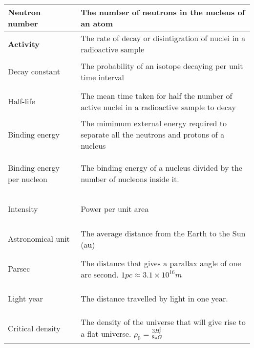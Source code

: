 \documentclass{article}
\begin{document}
\begin{longtable}{>{\bf\centering\arraybackslash}p{1in} 
  p{\textwidth-4\tabcolsep-1in}}
  Neutron number & The number of neutrons in the nucleus of an atom\\ \midrule

  Activity & The rate of decay or disintigration of nuclei in a radioactive
  sample\\ \midrule

  Decay constant & The probability of an isotope decaying per unit time
  interval\\ \midrule

  Half-life & The mean time taken for half the number of active nuclei in a
  radioactive sample to decay\\ \midrule

  Binding energy & The mimimum external energy required to separate all the
  neutrons and protons of a nucleus\\ \midrule

  Binding energy per nucleon & The binding energy of a nucleus divided by the
  number of nucleons inside it.\\ \midrule

  Intensity & Power per unit area\\ \midrule

  Astronomical unit & The average distance from the Earth to the Sun (au)\\
  \midrule

  Parsec & The distance that gives a parallax angle of one arc second. $1pc
  \approx 3.1\times10^{16}m$\\ \midrule

  Light year & The distance travelled by light in one year.\\ \midrule

  Critical density & The density of the universe that will give rise to a flat universe. $\rho_0 = \frac{3H_0^2}{8\pi G}$\\ \midrule

\end{longtable}
\end{document}
